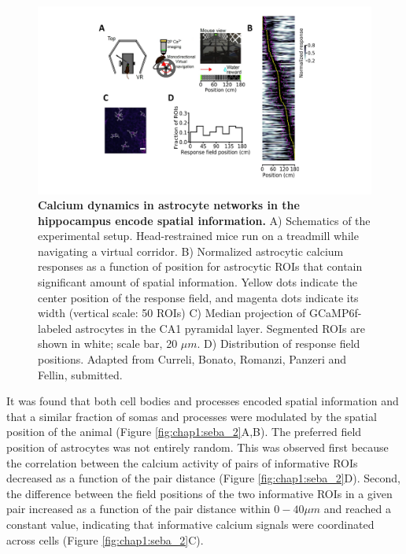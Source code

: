 \begin{figure}[h!]
    \centering
    \includegraphics[trim={175 45 160 0},clip,width=\textwidth]{Figures/Chapter1/intro_fig_seba_1.pdf}
    \caption[Calcium dynamics in astrocyte networks in the hippocampus encode spatial information]{\textbf{Calcium dynamics in astrocyte networks in the hippocampus encode spatial information.} 
    A) Schematics of the experimental setup. 
    Head-restrained mice run on a treadmill while navigating a virtual corridor. 
    B) Normalized astrocytic calcium responses as a function of position for astrocytic ROIs that contain significant amount of spatial information. 
    Yellow dots indicate the center position of the response field, and magenta dots indicate its width (vertical scale: 50 ROIs)
    C) Median projection of GCaMP6f-labeled astrocytes in the CA1 pyramidal layer. 
    Segmented ROIs are shown in white; scale bar, 20 $\mu m$.
    D) Distribution of response field positions. 
    Adapted from Curreli, Bonato, Romanzi, Panzeri and Fellin, submitted.
    }
    \label{fig:chap1:seba_1}
\end{figure}
It was found that both cell bodies and processes encoded spatial information and that a similar fraction of somas and processes were modulated by the spatial position of the animal (Figure \ref{fig:chap1:seba_2}A,B).
The preferred field position of astrocytes was not entirely random.
This was observed first because the correlation between the calcium activity of pairs of informative ROIs decreased as a function of the pair distance (Figure \ref{fig:chap1:seba_2}D).
Second, the difference between the field positions of the two informative ROIs in a given pair increased as a function of the pair distance within $0-40 \mu m$ and reached a constant value, indicating that informative calcium signals were coordinated across cells (Figure \ref{fig:chap1:seba_2}C).
